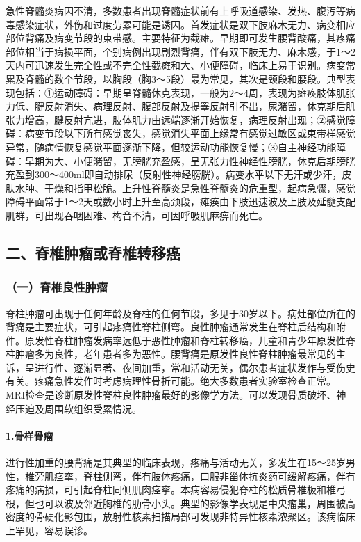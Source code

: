 急性脊髓炎病因不清，多数患者出现脊髓症状前有上呼吸道感染、发热、腹泻等病毒感染症状，外伤和过度劳累可能是诱因。首发症状是双下肢麻木无力、病变相应部位背痛及病变节段的束带感。主要特征为截瘫。早期即可发生腰背酸痛，其疼痛部位相当于病损平面，个别病例出现剧烈背痛，伴有双下肢无力、麻木感，于1～2天内可迅速发生完全性或不完全性截瘫和大、小便障碍，临床上易于识别。病变常累及脊髓的数个节段，以胸段（胸3～5段）最为常见，其次是颈段和腰段。典型表现包括：①运动障碍：早期呈脊髓休克表现，一般为2～4周，表现为瘫痪肢体肌张力低、腱反射消失、病理反射、腹部反射及提睾反射引不出，尿潴留，休克期后肌张力增高，腱反射亢进，肢体肌力由远端逐渐开始恢复，病理反射出现；②感觉障碍：病变节段以下所有感觉丧失，感觉消失平面上缘常有感觉过敏区或束带样感觉异常，随病情恢复感觉平面逐渐下降，但较运动功能恢复慢；③自主神经功能障碍：早期为大、小便潴留，无膀胱充盈感，呈无张力性神经性膀胱，休克后期膀胱充盈到300～400ml即自动排尿（反射性神经膀胱）。病变水平以下无汗或少汗，皮肤水肿、干燥和指甲松脆。上升性脊髓炎是急性脊髓炎的危重型，起病急骤，感觉障碍平面常于1～2天或数小时上升至高颈段，瘫痪由下肢迅速波及上肢及延髓支配肌群，可出现吞咽困难、构音不清，可因呼吸肌麻痹而死亡。

\subsection{二、脊椎肿瘤或脊椎转移癌}

\subsubsection{（一）脊椎良性肿瘤}

脊柱肿瘤可出现于任何年龄及脊柱的任何节段，多见于30岁以下。病灶部位所在的背痛是主要症状，可引起疼痛性脊柱侧弯。良性肿瘤通常发生在脊柱后结构和附件。原发性脊柱肿瘤发病率远低于恶性肿瘤和脊柱转移癌，儿童和青少年原发性脊柱肿瘤多为良性，老年患者多为恶性。腰背痛是原发性良性脊柱肿瘤最常见的主诉，呈进行性、逐渐显著、夜间加重，常和活动无关，偶尔患者症状发作与受伤史有关。疼痛急性发作时考虑病理性骨折可能。绝大多数患者实验室检查正常。MRI检查是诊断原发性脊柱良性肿瘤最好的影像学方法。可以发现骨质破坏、神经压迫及周围软组织受累情况。

\paragraph{1.骨样骨瘤}

进行性加重的腰背痛是其典型的临床表现，疼痛与活动无关，多发生在15～25岁男性，椎旁肌痉挛，脊柱侧弯，伴有肢体疼痛，口服非甾体抗炎药可缓解疼痛，伴有疼痛的病损，可引起脊柱同侧肌肉痉挛。本病容易侵犯脊柱的松质骨椎板和椎弓根，但也可以波及邻近胸椎的肋骨小头。典型的影像学表现是中央瘤巢，周围被高密度的骨硬化影包围，放射性核素扫描局部可发现非特异性核素浓聚区。该病临床上罕见，容易误诊。

